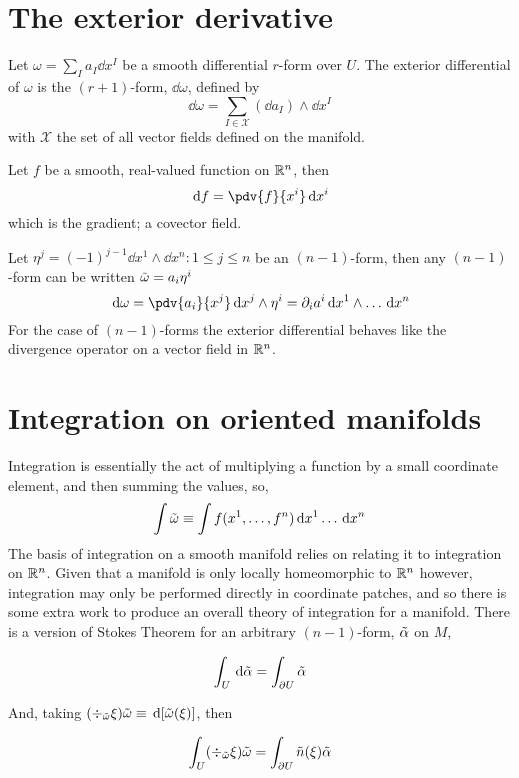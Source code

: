 \section{The exterior derivative}
\label{sec:diff-calc-forms}


\begin{definition}
  Let $\omega = \sum_I a_I \dd{x}^I$ be a smooth differential $r$-form
  over $U$. The exterior differential of $\omega$ is the $(r+1)$-form,
  $\dd{\omega}$, defined by \[ \dd{\omega} = \sum_{I \in \mathcal{X}}
  (\dd{a}_I) \wedge \dd{x}^I \] with $\mathcal{X}$ the set of all
  vector fields defined on the manifold.
\end{definition}

Let $f$ be a smooth, real-valued function on $\mathbb{R}^n$, then
\[ \dd{f} = \pdv{f}{x^i} \dd{x^i} \]
which is the gradient; a covector field.

Let $\eta^j = (-1)^{j-1} \dd{x^1} \wedge \dd{x^n} : 1 \leq j \leq n$
be an $(n-1)$-form, then any $(n-1)$-form can be written $\tilde{\omega} = a_i \eta^i$
\[ \dd{\omega} = \pdv{a_i}{x^j} \dd{x^j} \wedge \eta^i = \partial_i
a^i \dd{x^1} \wedge \dots \dd{x^n} \] For the case of $(n-1)$-forms
the exterior differential behaves like the divergence operator on a
vector field in $\mathbb{R}^n$.


\section{Integration on oriented manifolds}
\label{sec:integr-orient-manif}

Integration is essentially the act of multiplying a function by a
small coordinate element, and then summing the values, so,
\begin{equation}
  \label{eq:37}
  \int \tilde{\omega} \equiv \int f(x^1, \dots, f^n) \,\mathrm{d} x^1 \dots \,\mathrm{d} x^n
\end{equation}
The basis of integration on a smooth manifold relies on relating it to
integration on $\mathbb{R}^n$. Given that a manifold is only locally
homeomorphic to $\mathbb{R}^n$ however, integration may only be performed
directly in coordinate patches, and so there is some extra work to
produce an overall theory of integration for a manifold. There is a
version of Stokes Theorem for an arbitrary $(n-1)$-form, $\tilde{\alpha}$
on $M$,
\begin{theorem}
  \begin{equation}
\int_U \,\mathrm{d} \tilde{\alpha} = \int_{\partial U} \tilde{\alpha}
\end{equation}
\end{theorem}
And, taking $(\div_{\tilde{\omega}} \xi) \tilde{\omega} \equiv
\,\mathrm{d} [\tilde{\omega}(\xi)]$, then
\begin{theorem}
  \begin{equation}
    \label{eq:60}
    \int_U (\div_{\tilde{\omega}} \xi) \tilde{\omega} = \int_{\partial U} \tilde{n}(\xi) \tilde{\alpha}
  \end{equation}
\end{theorem}

